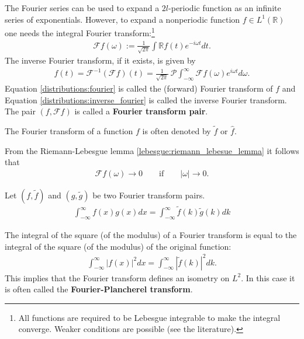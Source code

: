     The Fourier series can be used to expand a $2l$-periodic function as an infinite series of exponentials. However, to expand a nonperiodic function $f\in L^1(\mathbb{R})$ one needs the integral Fourier transform:\footnote{All functions are required to be Lebesgue integrable to make the integral converge. Weaker conditions are possible (see the literature).}
    \begin{gather}
        \label{distributions:fourier}
        \mathcal{F}f(\omega) := \frac{1}{\sqrt{2\pi}}\int\mathbb{R}f(t)e^{-i\omega t}dt.
    \end{gather}
    The inverse Fourier transform, if it exists, is given by
    \begin{gather}
        \label{distributions:inverse_fourier}
        f(t) = \mathcal{F}^{-1}(\mathcal{F}f)(t) = \frac{1}{\sqrt{2\pi}}\  \mathcal{P}\int_{-\infty}^\infty\mathcal{F}f(\omega)e^{i\omega t}d\omega.
    \end{gather}
    Equation \eqref{distributions:fourier} is called the (forward) Fourier transform of $f$ and Equation \eqref{distributions:inverse_fourier} is called the inverse Fourier transform. The pair $(f,\mathcal{F}f)$ is called a \textbf{Fourier transform pair}.
    \begin{notation}
        The Fourier transform of a function $f$ is often denoted by $\widetilde{f}$ or $\widehat{f}$.
    \end{notation}

    \begin{property}
        From the Riemann-Lebesgue lemma \ref{lebesgue:riemann_lebesue_lemma} it follows that
        \begin{gather}
            \mathcal{F}f(\omega)\longrightarrow0\qquad\text{if}\qquad |\omega|\longrightarrow0.
        \end{gather}
    \end{property}

    \begin{theorem}[Parceval]\label{distributions:parcevals_theorem}
        Let $(f,\widetilde{f})$ and $(g,\widetilde{g})$ be two Fourier transform pairs.
        \begin{gather}
            \int_{-\infty}^\infty f(x)g(x)dx = \int_{-\infty}^\infty\widetilde{f}(k)\widetilde{g}(k)dk
        \end{gather}
    \end{theorem}
    \begin{result}[Plancherel]\label{distributions:plancherel_theorem}
        The integral of the square (of the modulus) of a Fourier transform is equal to the integral of the square (of the modulus) of the original function:
        \begin{gather}
            \int_{-\infty}^\infty|f(x)|^2dx = \int_{-\infty}^\infty|\widetilde{f}(k)|^2dk.
        \end{gather}
        This implies that the Fourier transform defines an isometry on $L^2$. In this case it is often called the \textbf{Fourier-Plancherel transform}.
    \end{result}

